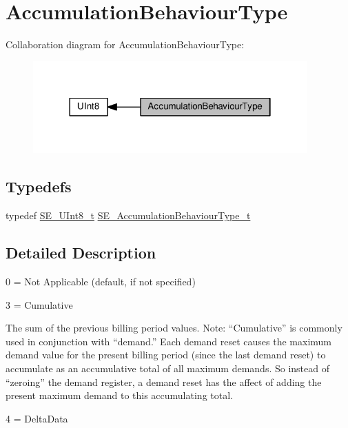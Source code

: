 \hypertarget{group__AccumulationBehaviourType}{}\section{Accumulation\+Behaviour\+Type}
\label{group__AccumulationBehaviourType}
Collaboration diagram for Accumulation\+Behaviour\+Type\+:\nopagebreak
\begin{figure}[H]
\begin{center}
\leavevmode
\includegraphics[width=298pt]{group__AccumulationBehaviourType}
\end{center}
\end{figure}
\subsection*{Typedefs}
\begin{DoxyCompactItemize}
\item 
typedef \hyperlink{group__UInt8_gaf7c365a1acfe204e3a67c16ed44572f5}{S\+E\+\_\+\+U\+Int8\+\_\+t} \hyperlink{group__AccumulationBehaviourType_gaa25de69f43be64dff9ec0bdf3ef685d2}{S\+E\+\_\+\+Accumulation\+Behaviour\+Type\+\_\+t}
\end{DoxyCompactItemize}


\subsection{Detailed Description}
0 = Not Applicable (default, if not specified)

3 = Cumulative

The sum of the previous billing period values. Note\+: “\+Cumulative” is commonly used in conjunction with “demand.\+” Each demand reset causes the maximum demand value for the present billing period (since the last demand reset) to accumulate as an accumulative total of all maximum demands. So instead of “zeroing” the demand register, a demand reset has the affect of adding the present maximum demand to this accumulating total.

4 = Delta\+Data

